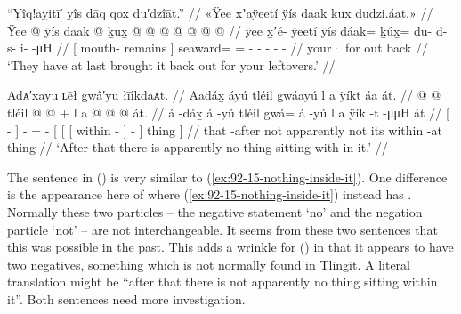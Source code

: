 \ex\label{ex:92-21-ppl-brought-out-leftovers-for-you}%
%
\begingl
	\glpreamble	“Ỵîq!aỵitī′ ỵîs dāq qox du′dzîāt.” //
	\glpreamble	«\!Ÿee x̱ʼaÿeetí ÿís daak ḵux̱ dudzi.áat.\!» //
	\gla	{} Ÿee  @ {} ÿís {}
		daak @ ḵux̱ @  @ {} @ {} @ {} @ {} @ {} @ {} //
	\glb	{} ÿee x̱ʼé- ÿeetí ÿís {}
		dáak= ḵúx̱= {} du- d- s- i-  -μH //
	\glc	{}[  mouth- remains  {}]
		seaward= = \· - - - -
			 - //
	\gld	{} your·  {} for {}
		out back\·  {} {} {} {} {} {} //
	\glft	‘They have at last brought it back out for your leftovers.’
		//
\endgl
\xe


\ex\label{ex:92-22-after-that-nothing-in-there}%
%
\begingl
	\glpreamble	Adᴀ′xayu ʟēł gwâ′yu łīîkdaᴀt. //
	\glpreamble	Aadáx̱ áyú tléil gwáayú l a ÿíkt áa át. //
	\gla	{}  @ {} {}  @ {}
		tléil  @ {} @ {} +
		{} l {} {} a  @ {} {}  @ {} @ {} {} át. {} //
	\glb	{} á -dáx̱ {} á -yú
		tléil gwá= á -yú
		{} l {} {} a ÿík -t {}  -μμH {} {} át {} //
	\glc	{}[  - {}]  -
		 =  -
		{}[  {}[ {}[  within - {}]
			 - \· {}] thing {}] //
	\gld	{} that -after {}  {}
		not apparently\·  {}
		{} not {} {} its within -at {}
			 {} {} {} thing {} //
	\glft	‘After that there is apparently no thing sitting with in it.’
		//
\endgl
\xe

The sentence in (\lastx) is very similar to (\ref{ex:92-15-nothing-inside-it}).
One difference is the appearance here of  where (\ref{ex:92-15-nothing-inside-it}) instead has .
Normally these two particles – the negative statement  ‘no’ and the negation particle  ‘not’ – are not interchangeable.
It seems from these two sentences that this was possible in the past.
This adds a wrinkle for (\lastx) in that it appears to have two negatives, something which is not normally found in Tlingit.
A literal translation might be “after that there is not apparently no thing sitting within it”.
Both sentences need more investigation.

